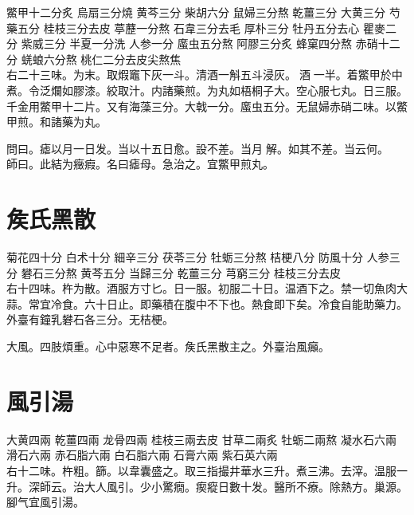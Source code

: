 鱉甲{\scriptsize 十二分炙} 烏扇{\scriptsize 三分燒} 黄芩{\scriptsize 三分} 柴胡{\scriptsize 六分} 鼠婦{\scriptsize 三分熬} 乾薑{\scriptsize 三分} 大黄{\scriptsize 三分} 芍藥{\scriptsize 五分} 桂枝{\scriptsize 三分去皮} 葶藶{\scriptsize 一分熬} 石韋{\scriptsize 三分去毛} 厚朴{\scriptsize 三分} 牡丹{\scriptsize 五分去心} 瞿麥{\scriptsize 二分} 紫威{\scriptsize 三分} 半夏{\scriptsize 一分洗} 人参{\scriptsize 一分} 䗪虫{\scriptsize 五分熬} 阿膠{\scriptsize 三分炙} 蜂窠{\scriptsize 四分熬} 赤硝{\scriptsize 十二分} 蜣蜋{\scriptsize 六分熬} 桃仁{\scriptsize 二分去皮尖熬焦}\\
右二十三味。为末。取煆竈下灰一斗。清酒一斛五斗浸灰。{\sungtpii 𠊱}酒{\sungtpii 𥁞}一半。着鱉甲於中煮。令泛爛如膠漆。絞取汁。内諸藥煎。为丸如梧桐子大。空心服七丸。日三服。{\scriptsize 千金用鱉甲十二片。又有海藻三分。大戟一分。䗪虫五分。无鼠婦赤硝二味。以鱉甲煎。和諸藥为丸。}

問曰。瘧以月一日发。当以十五日愈。設不差。当月{\sungtpii 𥁞}解。如其不差。当云何。\\
師曰。此結为癥瘕。名曰瘧母。急治之。宜鱉甲煎丸。

\section{矦氏黑散}

菊花{\scriptsize 四十分} 白术{\scriptsize 十分} 細辛{\scriptsize 三分} 茯苓{\scriptsize 三分} 牡蛎{\scriptsize 三分熬} 桔梗{\scriptsize 八分} 防風{\scriptsize 十分} 人参{\scriptsize 三分} 礬石{\scriptsize 三分熬} 黄芩{\scriptsize 五分} 当歸{\scriptsize 三分} 乾薑{\scriptsize 三分} 芎窮{\scriptsize 三分} 桂枝{\scriptsize 三分去皮}\\
右十四味。杵为散。酒服方寸匕。日一服。初服二十日。温酒下之。禁一切魚肉大蒜。常宜冷食。六十日止。即藥積在腹中不下也。熱食即下矣。冷食自能助藥力。{\scriptsize 外臺有鐘乳礬石各三分。无桔梗。}

大風。四肢煩重。心中惡寒不足者。矦氏黑散主之。{\scriptsize 外臺治風癲。}

\section{風引湯}

大黄{\scriptsize 四兩} 乾薑{\scriptsize 四兩} 龙骨{\scriptsize 四兩} 桂枝{\scriptsize 三兩去皮} 甘草{二兩炙} 牡蛎{\scriptsize 二兩熬} 凝水石{\scriptsize 六兩} 滑石{\scriptsize 六兩} 赤石脂{\scriptsize 六兩} 白石脂{\scriptsize 六兩} 石膏{\scriptsize 六兩} 紫石英{\scriptsize 六兩}\\
右十二味。杵粗。篩。以韋囊盛之。取三指撮井華水三升。煮三沸。去滓。温服一升。{\scriptsize 深師云。治大人風引。少小驚癇。瘈瘲日數十发。醫所不療。除熱方。巢源。腳气宜風引湯。}

